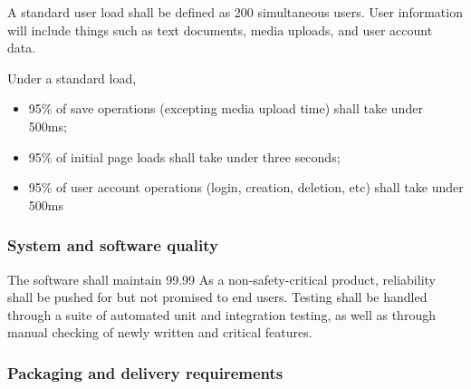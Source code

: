 \documentclass[letterpaper, 10pt, draftclsnofoot, onecolumn]{IEEEtran}
\begin{document}
{{A standard user load shall be defined as 200 simultaneous users. User information
will include things such as text documents, media uploads, and user account data.

Under a standard load,
\begin{itemize}
  \item 95\% of save operations (excepting media upload time) shall take under 500ms;
  \item 95\% of initial page loads shall take under three seconds;
  \item 95\% of user account operations (login, creation, deletion, etc) shall take under 500ms
\end{itemize}

\subsubsection[System and software
quality]{\rmfamily\bfseries\color{black} System
and software quality}

The software shall maintain 99.99%
As a non-safety-critical product, reliability shall be pushed for but not promised
to end users. Testing shall be handled through a suite of automated unit and integration testing, as well as
through manual checking of newly written and critical features.

\subsubsection[Packaging and delivery
requirements]{\rmfamily\bfseries\color{black}
Packaging and delivery requirements}


}}
\end{document}
